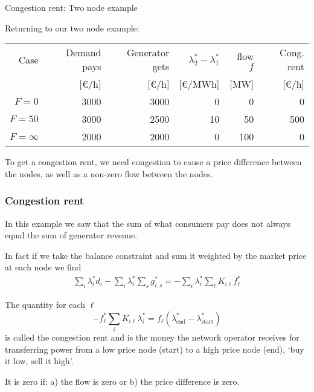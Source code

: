 \documentclass[10pt,aspectratio=169,dvipsnames]{beamer}
\newcommand{\ra}[1]{\renewcommand{\arraystretch}{#1}}
\def\l{\lambda}
\begin{document}
\begin{frame}{Congestion rent: Two node example}

  Returning to our two node example:
  \ra{1.1}
  \begin{table}[!t]
    \begin{tabular}{rrrrrr}
      \toprule
      Case & Demand pays & Generator gets & $\l_2^* - \l_1^*$ & flow $f$ & Cong. rent \\
       & [\euro/h] & [\euro/h] & [\euro/MWh] & [MW] & [\euro/h] \\
      \midrule
      $F = 0$ & 3000 & 3000 & 0 & 0 & 0 \\
      $F = 50$ & 3000 & 2500 & 10 & 50 & 500 \\
      $F = \infty$ & 2000 & 2000 & 0 & 100 & 0 \\
      \bottomrule
    \end{tabular}
  \end{table}

To get a congestion rent, we need congestion to cause a price
difference between the nodes, as well as a non-zero flow between the
nodes.

\end{frame}



\begin{frame}[fragile]
  \frametitle{Congestion rent}

  In this example we saw that the sum of what consumers pay does not always equal the sum of generator revenue.

  In fact if we take the balance constraint and sum it weighted by the market price at each node we find
  \begin{align*}
    \sum_i \l_i^* d_i -   \sum_i \l_i^* \sum_{s} g^*_{i,s} = -\sum_i \l_i^* \sum_\ell K_{i\ell}f^*_\ell
  \end{align*}

  The quantity for each $\ell$
  \begin{equation*}
    -f_\ell^*\sum_i K_{i\ell} \l_i^* = f_\ell (\l_{\textrm{end}}^* - \l_{\textrm{start}}^*)
  \end{equation*}
  is called the \alert{congestion rent} and is the money the network
  operator receives for transferring power from a low price node (start)
  to a high price node (end), `buy it low, sell it high'.

  It is zero if: a) the flow is zero or b) the price difference is zero.

\end{frame}
\end{document}
